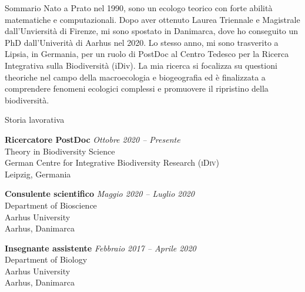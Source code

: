 \documentclass{resume} %
\begin{document}
\begin{rSection}{Sommario}
Nato a Prato nel 1990, sono un ecologo teorico con forte abilit\`{a} matematiche e computazionali.
Dopo aver ottenuto Laurea Triennale e Magistrale dall'Unviersit\`{a} di Firenze, mi sono spostato in Danimarca, dove ho conseguito un PhD dall'Univerit\`{a} di Aarhus nel 2020.
Lo stesso anno, mi sono trasverito a Lipsia, in Germania, per un ruolo di PostDoc al Centro Tedesco per la Ricerca Integrativa sulla Biodiversit\`{a} (iDiv).
La mia ricerca si focalizza su questioni theoriche nel campo della macroecologia e biogeografia ed \`{e} finalizzata a comprendere fenomeni ecologici complessi e promuovere il ripristino della biodiversit\`{a}.
\end{rSection}

\begin{rSection}{Storia lavorativa}

{\bf Ricercatore PostDoc} \hfill {\em Ottobre 2020 -- Presente}\\
Theory in Biodiversity Science\\
German Centre for Integrative Biodiversity Research (\textsc{iDiv})\\
Leipzig, Germania

{\bf Consulente scientifico} \hfill {\em Maggio 2020 -- Luglio 2020}\\
Department of Bioscience\\
Aarhus University\\
Aarhus, Danimarca

{\bf Insegnante assistente} \hfill {\em Febbraio 2017 -- Aprile 2020}\\
Department of Biology\\
Aarhus University\\
Aarhus, Danimarca

\end{rSection}
\end{document}
